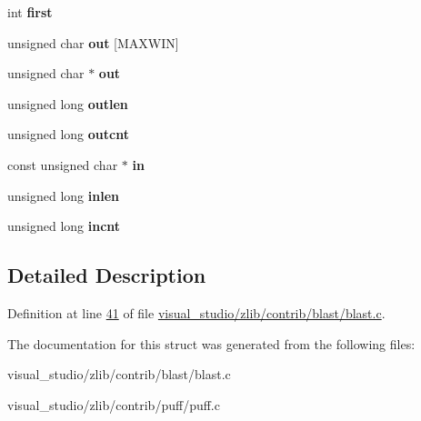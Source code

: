 \begin{DoxyCompactItemize}
int {\bfseries first}
\item 
\mbox{\label{structstate_a5f8d6dd82cebaef31e161ac1a9462b3a}} 
unsigned char {\bfseries out} \mbox{[}M\+A\+X\+W\+IN\mbox{]}
\item 
\mbox{\label{structstate_a8802c4d6ed3336d4d1f9a1ca86e0b1eb}} 
unsigned char $\ast$ {\bfseries out}
\item 
\mbox{\label{structstate_aaebd08f33d7abe207a4de1527a64cd73}} 
unsigned long {\bfseries outlen}
\item 
\mbox{\label{structstate_a1b2e28e1c4dcc49af3858035fffde8c2}} 
unsigned long {\bfseries outcnt}
\item 
\mbox{\label{structstate_ae83ad4097b413d5cce216cd9642cdf36}} 
const unsigned char $\ast$ {\bfseries in}
\item 
\mbox{\label{structstate_af4a6c0ae835bf45ee8b31b77fc1244c5}} 
unsigned long {\bfseries inlen}
\item 
\mbox{\label{structstate_a62991c0e1ba7aede1c8f81104a6e1646}} 
unsigned long {\bfseries incnt}
\end{DoxyCompactItemize}


\subsection{Detailed Description}


Definition at line \hyperlink{visual__studio_2zlib_2contrib_2blast_2blast_8c_source_l00041}{41} of file \hyperlink{visual__studio_2zlib_2contrib_2blast_2blast_8c_source}{visual\+\_\+studio/zlib/contrib/blast/blast.\+c}.



The documentation for this struct was generated from the following files\+:\begin{DoxyCompactItemize}
\item 
visual\+\_\+studio/zlib/contrib/blast/blast.\+c\item 
visual\+\_\+studio/zlib/contrib/puff/puff.\+c\end{DoxyCompactItemize}
